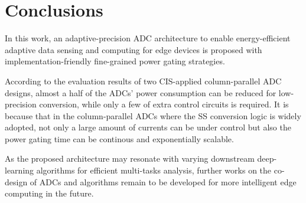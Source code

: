 \section{Conclusions}\label{conclusion}

In this work, an adaptive-precision ADC architecture to enable energy-efficient adaptive data sensing and computing for edge devices is proposed with implementation-friendly fine-grained power gating strategies.

According to the evaluation results of two CIS-applied column-parallel ADC designs, almost a half of the ADCs’ power consumption can be reduced for low-precision conversion, 
while only a few of extra control circuits is required.
It is because that in the column-parallel ADCs where the SS conversion logic is widely adopted, not only a large amount of currents can be under control but also the power gating time can be continous and exponentially scalable. 

As the proposed architecture may resonate with varying downstream deep-learning algorithms for efficient multi-tasks analysis, further works on the co-design of ADCs and algorithms remain to be developed for more intelligent edge computing in the future.